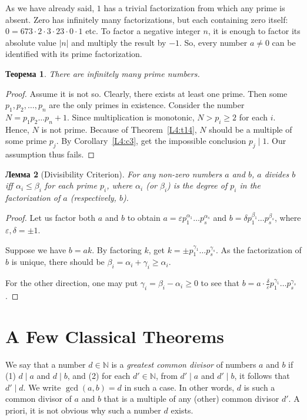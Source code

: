 \documentclass[12pt,notitlepage]{article}
\theoremstyle{plain}
\newtheorem{thm}{Теорема}[section]
\newtheorem{lemma}[thm]{Лемма}
\theoremstyle{definition}
\theoremstyle{plain}
\newcommand{\N}{\mathbb{N}}
\newcommand{\eps}{\varepsilon}
\newcommand{\1}{\mathbf{1}}
\newcommand{\0}{\mathbf{0}}
\newcommand{\dvd}{\mathop{\mid}}
\begin{document}
As we have already said, $1$ has a trivial factorization from which any prime is absent. Zero has infinitely many factorizations, but each containing zero itself: $0 = 673 \cdot 2 \cdot 3 \cdot 23 \cdot 0 \cdot 1$ etc. To factor a negative integer $n$, it is enough to factor its absolute value $|n|$ and multiply the result by $-1$. So, every number $a \neq 0$ can be identified with its prime factorization.

\begin{thm}
	There are infinitely many prime numbers.
\end{thm}
\begin{proof}
	Assume it is not so. Clearly, there exists at least one prime. Then some $p_1, p_2, \ldots, p_n$ are the only primes in existence. Consider the number $N = p_1 p_2 \ldots p_n + 1$. Since multiplication is monotonic, $N > p_i \geq 2$ for each $i$. Hence, $N$ is not prime. Because of Theorem~\ref{L4:t14}, $N$ should be a multiple of some prime $p_j$. By Corollary~\ref{L4:c3}, get the impossible conclusion $p_j \dvd 1$. Our assumption thus fails.
\end{proof}



\begin{lemma}[Divisibility Criterion]\label{L4:l16}
	For any non-zero numbers $a$ and $b$, $a$ divides $b$ iff $\alpha_i \leq \beta_i$ for each prime $p_i$, where $\alpha_i$ (or $\beta_i$) is the degree of $p_i$ in the factorization of $a$ (respectively, $b$).
\end{lemma} 
\begin{proof}
	Let us factor both $a$ and $b$ to obtain $a = \eps p^{\alpha_1}_1\ldots p^{\alpha_s}_s$ and $b = \delta p^{\beta_1}_1\ldots p^{\beta_s}_s$, where $\eps, \delta = \pm 1$.
	
	Suppose we have $b = a k$. By factoring $k$, get $k = \pm p^{\gamma_1}_1\ldots p^{\gamma_s}_s$. As the factorization of $b$ is unique, there should be $\beta_i = \alpha_i + \gamma_i \geq \alpha_i$.
	
	For the other direction, one may put $\gamma_i = \beta_i - \alpha_i \geq 0$ to see that $b = a \cdot \frac{\delta}{\eps}  p^{\gamma_1}_1\ldots p^{\gamma_s}_s$.
\end{proof}

\section{A Few Classical Theorems}

We say that a number $d \in \N$ is a \emph{greatest common divisor} of numbers $a$ and $b$ if (1) $d \dvd a$ and $d \dvd b$, and (2) for each $d' \in \N$, from $d' \dvd a$ and $d' \dvd b$, it follows that $d' \dvd d$. We write $\gcd(a, b) = d$ in such a case. In other words, $d$ is such a common divisor of $a$ and $b$ that is a multiple of any (other) common divisor $d'$. A priori, it is not obvious why such a number $d$ exists.
\end{document}
